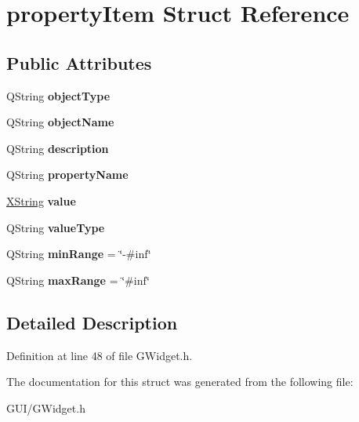 \hypertarget{structproperty_item}{}\section{property\+Item Struct Reference}
\label{structproperty_item}
\subsection*{Public Attributes}
\begin{DoxyCompactItemize}
\item 
\mbox{\label{structproperty_item_a58bf42c57ea671f471b7503f3399fb9c}} 
Q\+String {\bfseries object\+Type}
\item 
\mbox{\label{structproperty_item_aa1b96bf8de01c3c4ad373da01c6c9315}} 
Q\+String {\bfseries object\+Name}
\item 
\mbox{\label{structproperty_item_a639618e82d5481da02c1e955e80b376c}} 
Q\+String {\bfseries description}
\item 
\mbox{\label{structproperty_item_aa073f1b8621542e33bbe0c803373f8b3}} 
Q\+String {\bfseries property\+Name}
\item 
\mbox{\label{structproperty_item_a29e47d162a528c427590e742c2835941}} 
\hyperlink{class_x_string}{X\+String} {\bfseries value}
\item 
\mbox{\label{structproperty_item_a8fb901a984fd532fc4ac1bc7b0084efc}} 
Q\+String {\bfseries value\+Type}
\item 
\mbox{\label{structproperty_item_accf6c838da3b6c22563c6bcbefcf5e8d}} 
Q\+String {\bfseries min\+Range} = \char`\"{}-\/\#inf\char`\"{}
\item 
\mbox{\label{structproperty_item_ae0a2475a3f6a4a46dde6896754dd49d3}} 
Q\+String {\bfseries max\+Range} = \char`\"{}\#inf\char`\"{}
\end{DoxyCompactItemize}


\subsection{Detailed Description}


Definition at line 48 of file G\+Widget.\+h.



The documentation for this struct was generated from the following file\+:\begin{DoxyCompactItemize}
\item 
G\+U\+I/G\+Widget.\+h\end{DoxyCompactItemize}
